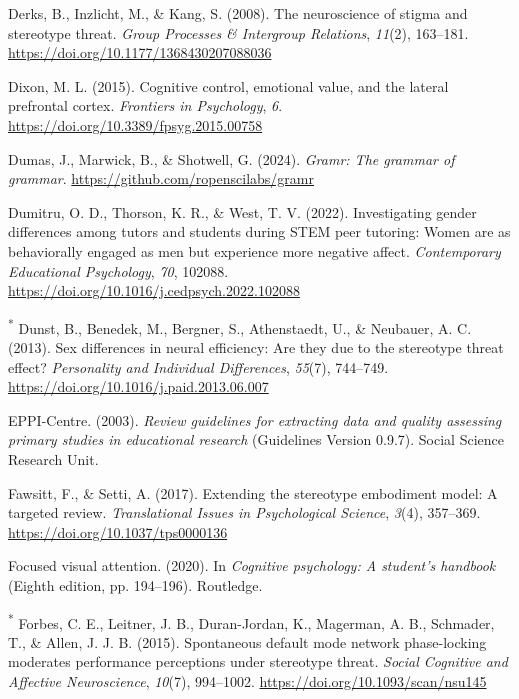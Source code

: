 \documentclass[
  stu, a4paper,floatsintext]{apa7}
\newlength{\cslhangindent}
\newenvironment{CSLReferences}[2] %
 {\begin{list}{}{%
  \setlength{\itemindent}{0pt}
  \setlength{\leftmargin}{0pt}
  \setlength{\parsep}{0pt}
  \ifodd #1
   \setlength{\leftmargin}{\cslhangindent}
   \setlength{\itemindent}{-1\cslhangindent}
  \fi
  \setlength{\itemsep}{#2\baselineskip}}}
 {\end{list}}
\begin{document}
\begin{CSLReferences}{1}{0}
Derks, B., Inzlicht, M., \& Kang, S. (2008). The neuroscience of stigma and stereotype threat. \emph{Group Processes \& Intergroup Relations}, \emph{11}(2), 163--181. \url{https://doi.org/10.1177/1368430207088036}

Dixon, M. L. (2015). Cognitive control, emotional value, and the lateral prefrontal cortex. \emph{Frontiers in Psychology}, \emph{6}. \url{https://doi.org/10.3389/fpsyg.2015.00758}

Dumas, J., Marwick, B., \& Shotwell, G. (2024). \emph{Gramr: The grammar of grammar}. \url{https://github.com/ropenscilabs/gramr}

Dumitru, O. D., Thorson, K. R., \& West, T. V. (2022). Investigating gender differences among tutors and students during {STEM} peer tutoring: {Women} are as behaviorally engaged as men but experience more negative affect. \emph{Contemporary Educational Psychology}, \emph{70}, 102088. \url{https://doi.org/10.1016/j.cedpsych.2022.102088}

\textsuperscript{*} Dunst, B., Benedek, M., Bergner, S., Athenstaedt, U., \& Neubauer, A. C. (2013). Sex differences in neural efficiency: {Are} they due to the stereotype threat effect? \emph{Personality and Individual Differences}, \emph{55}(7), 744--749. \url{https://doi.org/10.1016/j.paid.2013.06.007}

EPPI-Centre. (2003). \emph{Review guidelines for extracting data and quality assessing primary studies in educational research} (Guidelines Version 0.9.7). Social Science Research Unit.

Fawsitt, F., \& Setti, A. (2017). Extending the stereotype embodiment model: A targeted review. \emph{Translational Issues in Psychological Science}, \emph{3}(4), 357--369. \url{https://doi.org/10.1037/tps0000136}

Focused visual attention. (2020). In \emph{Cognitive psychology: A student's handbook} (Eighth edition, pp. 194--196). Routledge.

\textsuperscript{*} Forbes, C. E., Leitner, J. B., Duran-Jordan, K., Magerman, A. B., Schmader, T., \& Allen, J. J. B. (2015). Spontaneous default mode network phase-locking moderates performance perceptions under stereotype threat. \emph{Social Cognitive and Affective Neuroscience}, \emph{10}(7), 994--1002. \url{https://doi.org/10.1093/scan/nsu145}


\end{CSLReferences}
\end{document}
